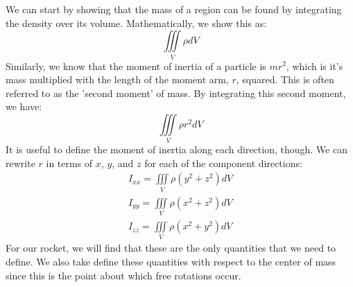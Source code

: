 \documentclass[12pt]{report}
\begin{document}
We can start by showing that the mass of a region can be found by integrating the density over its volume. Mathematically, we show this as:
$$\iiint\limits_V{\rho}{dV}$$
Similarly, we know that the moment of inertia of a particle is $mr^2$, which is it's mass multiplied with the length of the moment arm, $r$, squared. This is often referred to as the 'second moment' of mass. By integrating this second moment, we have:
$$\iiint\limits_V{\rho}{r^2}{dV}$$
It is useful to define the moment of inertia along each direction, though. We can rewrite $r$ in terms of $x$, $y$, and $z$ for each of the component directions:
\begin{gather}
    I_{xx}=\iiint\limits_V{\rho}{\left(y^2+z^2\right)}{dV}\\
    I_{yy}=\iiint\limits_V{\rho}{\left(x^2+z^2\right)}{dV}\\
    I_{zz}=\iiint\limits_V{\rho}{\left(x^2+y^2\right)}{dV}
\end{gather}
For our rocket, we will find that these are the only quantities that we need to define. We also take define these quantities with respect to the center of mass since this is the point about which free rotations occur.
\end{document}
